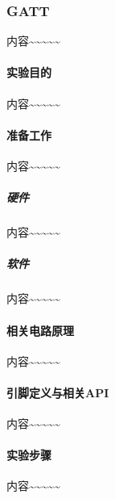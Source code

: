 \documentclass[a4paper,12pt,english]{sphinxmanual}
\begin{document}
\sphinxstepscope


\subsubsection{GATT}
\label{\detokenize{exp-stm32/ble/ble-gatt:gatt}}\label{\detokenize{exp-stm32/ble/ble-gatt::doc}}
\sphinxAtStartPar
内容\textasciitilde{}\textasciitilde{}\textasciitilde{}\textasciitilde{}\textasciitilde{}


\paragraph{实验目的}
\label{\detokenize{exp-stm32/ble/ble-gatt:id1}}
\sphinxAtStartPar
内容\textasciitilde{}\textasciitilde{}\textasciitilde{}\textasciitilde{}\textasciitilde{}


\paragraph{准备工作}
\label{\detokenize{exp-stm32/ble/ble-gatt:id2}}
\sphinxAtStartPar
内容\textasciitilde{}\textasciitilde{}\textasciitilde{}\textasciitilde{}\textasciitilde{}


\subparagraph{硬件}
\label{\detokenize{exp-stm32/ble/ble-gatt:id3}}
\sphinxAtStartPar
内容\textasciitilde{}\textasciitilde{}\textasciitilde{}\textasciitilde{}\textasciitilde{}


\subparagraph{软件}
\label{\detokenize{exp-stm32/ble/ble-gatt:id4}}
\sphinxAtStartPar
内容\textasciitilde{}\textasciitilde{}\textasciitilde{}\textasciitilde{}\textasciitilde{}


\paragraph{相关电路原理}
\label{\detokenize{exp-stm32/ble/ble-gatt:id5}}
\sphinxAtStartPar
内容\textasciitilde{}\textasciitilde{}\textasciitilde{}\textasciitilde{}\textasciitilde{}


\paragraph{引脚定义与相关API}
\label{\detokenize{exp-stm32/ble/ble-gatt:api}}
\sphinxAtStartPar
内容\textasciitilde{}\textasciitilde{}\textasciitilde{}\textasciitilde{}\textasciitilde{}


\paragraph{实验步骤}
\label{\detokenize{exp-stm32/ble/ble-gatt:id6}}
\sphinxAtStartPar
内容\textasciitilde{}\textasciitilde{}\textasciitilde{}\textasciitilde{}\textasciitilde{}
\end{document}
